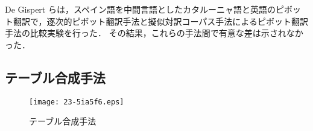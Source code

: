\documentclass[japanese]{jnlp_1.4}
\begin{document}
De Gispert らは，スペイン語を中間言語としたカタルーニャ語と英語のピボット翻訳で，逐次的ピボット翻訳手法と擬似対訳コーパス手法によるピボット翻訳手法の比較実験\cite{gispert06}を行った．
その結果，これらの手法間で有意な差は示されなかった．


\subsection{テーブル合成手法}
\label{sec:triangulation}

\begin{figure}[b]
\begin{center}
\texttt{[image: 23-5ia5f6.eps]}
\end{center}
\caption{テーブル合成手法}
\label{fig:pivot-triangulation}
\end{figure}
\end{document}
